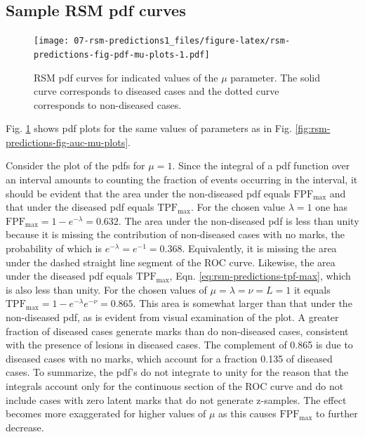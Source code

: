 \documentclass[
]{book}
\begin{document}
\hypertarget{rsm-predictions-pdf-curves}{%
\subsection{Sample RSM pdf curves}\label{rsm-predictions-pdf-curves}}

\begin{figure}
\centering
\texttt{[image: 07-rsm-predictions1\_files/figure-latex/rsm-predictions-fig-pdf-mu-plots-1.pdf]}
\caption{\label{fig:rsm-predictions-fig-pdf-mu-plots}RSM pdf curves for indicated values of the \(\mu\) parameter. The solid curve corresponds to diseased cases and the dotted curve corresponds to non-diseased cases.}
\end{figure}

Fig. \ref{fig:rsm-predictions-fig-pdf-mu-plots} shows pdf plots for the same values of parameters as in Fig. \ref{fig:rsm-predictions-fig-auc-mu-plots}.

Consider the plot of the pdfs for \(\mu = 1\). Since the integral of a pdf function over an interval amounts to counting the fraction of events occurring in the interval, it should be evident that the area under the non-diseased pdf equals \(\text{FPF}_{\text{max}}\) and that under the diseased pdf equals \(\text{TPF}_{\text{max}}\). For the chosen value \(\lambda = 1\) one has \(\text{FPF}_{\text{max}} = 1 - e^{-\lambda} = 0.632\). The area under the non-diseased pdf is less than unity because it is missing the contribution of non-diseased cases with no marks, the probability of which is \(e^{-\lambda} = e^{-1} = 0.368\). Equivalently, it is missing the area under the dashed straight line segment of the ROC curve. Likewise, the area under the diseased pdf equals \(\text{TPF}_{\text{max}}\), Eqn. \eqref{eq:rsm-predictions-tpf-max}, which is also less than unity. For the chosen values of \(\mu = \lambda = \nu = L = 1\) it equals \(\text{TPF}_{\text{max}} = 1 - e^{-\lambda} e^{-\nu} = 0.865\). This area is somewhat larger than that under the non-diseased pdf, as is evident from visual examination of the plot. A greater fraction of diseased cases generate marks than do non-diseased cases, consistent with the presence of lesions in diseased cases. The complement of 0.865 is due to diseased cases with no marks, which account for a fraction 0.135 of diseased cases. To summarize, the pdf's do not integrate to unity for the reason that the integrals account only for the continuous section of the ROC curve and do not include cases with zero latent marks that do not generate z-samples. The effect becomes more exaggerated for higher values of \(\mu\) as this causes \(\text{FPF}_{\text{max}}\) to further decrease.
\end{document}
